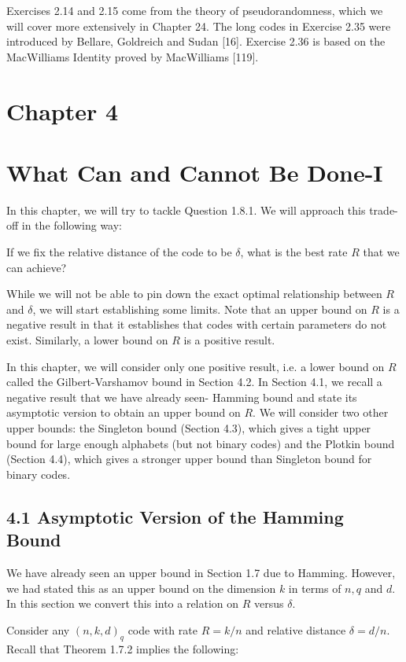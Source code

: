 \documentclass[10pt]{article}
\begin{document}
Exercises 2.14 and 2.15 come from the theory of pseudorandomness, which we will cover more extensively in Chapter 24. The long codes in Exercise 2.35 were introduced by Bellare, Goldreich and Sudan [16]. Exercise 2.36 is based on the MacWilliams Identity proved by MacWilliams [119].

\section*{Chapter 4}
\section*{What Can and Cannot Be Done-I}
In this chapter, we will try to tackle Question 1.8.1. We will approach this trade-off in the following way:

\begin{displayquote}
If we fix the relative distance of the code to be $\delta$, what is the best rate $R$ that we can achieve?
\end{displayquote}

While we will not be able to pin down the exact optimal relationship between $R$ and $\delta$, we will start establishing some limits. Note that an upper bound on $R$ is a negative result in that it establishes that codes with certain parameters do not exist. Similarly, a lower bound on $R$ is a positive result.

In this chapter, we will consider only one positive result, i.e. a lower bound on $R$ called the Gilbert-Varshamov bound in Section 4.2. In Section 4.1, we recall a negative result that we have already seen- Hamming bound and state its asymptotic version to obtain an upper bound on $R$. We will consider two other upper bounds: the Singleton bound (Section 4.3), which gives a tight upper bound for large enough alphabets (but not binary codes) and the Plotkin bound (Section 4.4), which gives a stronger upper bound than Singleton bound for binary codes.

\subsection*{4.1 Asymptotic Version of the Hamming Bound}
We have already seen an upper bound in Section 1.7 due to Hamming. However, we had stated this as an upper bound on the dimension $k$ in terms of $n, q$ and $d$. In this section we convert this into a relation on $R$ versus $\delta$.

Consider any $(n, k, d)_{q}$ code with rate $R=k / n$ and relative distance $\delta=d / n$. Recall that Theorem 1.7.2 implies the following:
\end{document}
